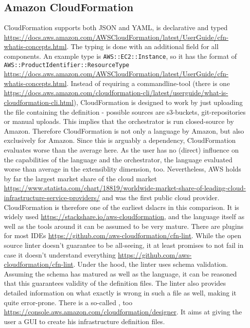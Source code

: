 \subsection{Amazon CloudFormation}
CloudFormation supports both JSON and YAML, is declarative and typed \url{https://docs.aws.amazon.com/AWSCloudFormation/latest/UserGuide/cfn-whatis-concepts.html}. The typing is done with an additional field  for all components. An example type is \texttt{AWS::EC2::Instance}, so it has the format of \texttt{AWS::ProductIdentifier::ResourceType} \url{https://docs.aws.amazon.com/AWSCloudFormation/latest/UserGuide/cfn-whatis-concepts.html}.
\newline
Instead of requiring a commandline-tool (there is one \url{https://docs.aws.amazon.com/cloudformation-cli/latest/userguide/what-is-cloudformation-cli.html}), CloudFormation is designed to work by just uploading the file containing the definition - possible sources are s3-buckets, git-repositories or manual uploads. This implies that the orchestrator is run closed-source by Amazon. Therefore CloudFormation is not only a language by Amazon, but also exclusively for Amazon. Since this is arguably a dependency, CloudFormation evaluates worse than the average here. As the user has no (direct) influence on the capabilities of the language and the orchestrator, the language evaluated worse than average in the extensiblity dimension, too.
\newline
Nevertheless, AWS holds by far the largest market share of the cloud market \url{https://www.statista.com/chart/18819/worldwide-market-share-of-leading-cloud-infrastructure-service-providers/} and was the first public cloud provider. CloudFormation is therefore one of the earliest \gls{dslacr}s in this comparison. It is widely used \url{https://stackshare.io/aws-cloudformation}, and the language itself as well as the tools around it can be assumed to be very mature. There are plugins for most IDEs \url{https://github.com/aws-cloudformation/cfn-lint}. While the open source linter doesn't guarantee to be all-seeing, it at least promises to not fail in case it doesn't understand everything \url{https://github.com/aws-cloudformation/cfn-lint}. Under the hood, the linter uses schema validation. Assuming the schema has matured as well as the language, it can be reasoned that this guarantees validity of the definition files. The linter also provides detailed information on what exactly is wrong in such a file as well, making it quite error-prone. There is a so-called , too \url{https://console.aws.amazon.com/cloudformation/designer}. It aims at giving the user a GUI to create his infrastructure definition files.
